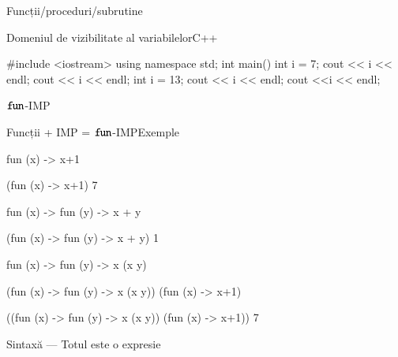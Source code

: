 \documentclass[xcolor=pdftex,romanian,colorlinks]{beamer}
\begin{document}
\begin{section}{Funcții/proceduri/subrutine}
\begin{frame}[fragile]{Domeniul de vizibilitate al variabilelor}{C++}
\begin{asciic}
#include <iostream>
using namespace std;
int main()  {
  int i = 7;
  cout << i << endl;
  {
     cout << i << endl;
     int i = 13;
     cout << i << endl;
  }
  cout <<i << endl;
}
\end{asciic}
\end{frame}


\end{section}

\begin{section}{$\mathrel{\text{\ttfamily fun}}$-IMP}
\begin{frame}[fragile]{Funcții + IMP = $\mathrel{\text{\ttfamily fun}}$-IMP}{Exemple}
\begin{asciiml}
fun (x) -> x+1

(fun (x) -> x+1) 7

fun (x) -> fun (y) -> x + y

(fun (x) -> fun (y) -> x + y) 1

fun (x) -> fun (y) -> x (x y)

(fun (x) -> fun (y) -> x (x y)) (fun (x) -> x+1)

((fun (x) -> fun (y) -> x (x y)) (fun (x) -> x+1)) 7
\end{asciiml}
\end{frame}


\begin{frame}[fragile]{}{Sintaxă --- Totul este o expresie}
\vspace{-5ex}
\end{frame}


\end{section}
\end{document}
